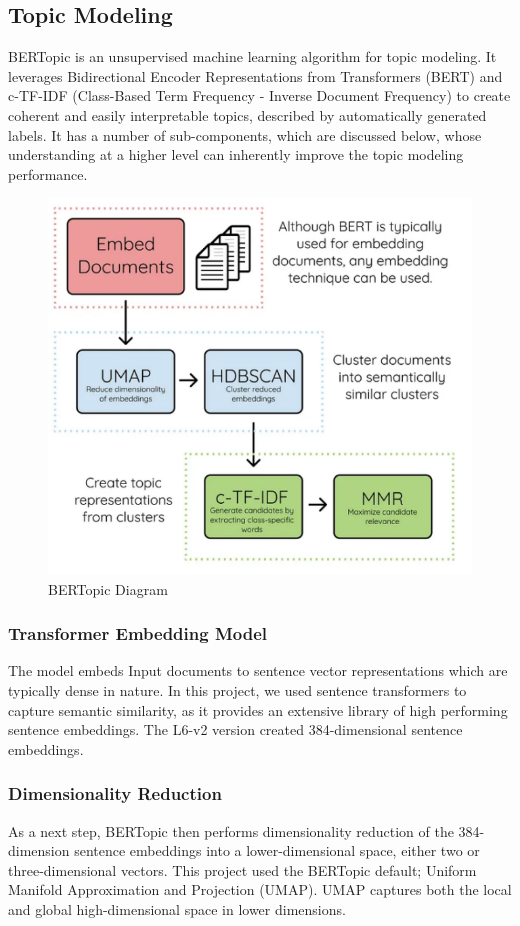 \documentclass{article}
\theoremstyle{mytheoremstyle}
\theoremstyle{mytheoremstyle}
\theoremstyle{myproblemstyle}
\begin{document}
    \subsection{Topic Modeling}

    BERTopic is an unsupervised machine learning  algorithm for topic modeling. It leverages Bidirectional Encoder Representations from Transformers (BERT) and c-TF-IDF (Class-Based Term Frequency - Inverse Document Frequency) to create coherent and easily interpretable topics, described by automatically generated labels. It has a number of sub-components, which are discussed below, whose understanding at a higher level can inherently improve the topic modeling performance. \cite{grootendorst2022bertopic}
    
    \begin{figure}[ht]
        \centering
        \includegraphics[width=0.5\linewidth]{../images/BERTopic_diagram.png}
        \caption{BERTopic Diagram}
        \label{fig:bertopic_diagram}
    \end{figure}

    \subsubsection{Transformer Embedding Model}
    The model embeds Input documents to sentence vector representations which are typically dense in nature. In this project, we used sentence transformers to capture semantic similarity, as it provides an extensive library of high performing sentence embeddings. The L6-v2 version created 384-dimensional sentence embeddings.

    \subsubsection{Dimensionality Reduction}
    As a next step, BERTopic then performs dimensionality reduction of the 384-dimension sentence embeddings into a lower-dimensional space, either two or three-dimensional vectors. This project used the BERTopic default; Uniform Manifold Approximation and Projection (UMAP). UMAP captures both the local and global high-dimensional space in lower dimensions.
\end{document}
